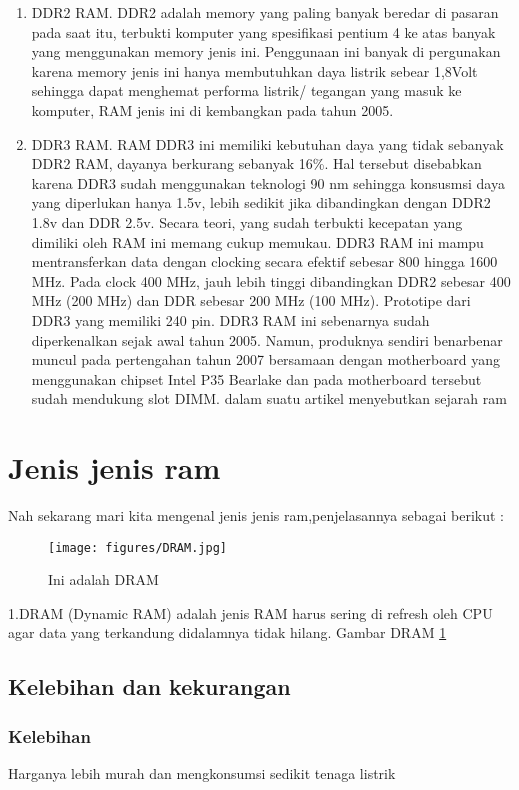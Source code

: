 \begin{enumerate}
\item DDR2 RAM. DDR2 adalah memory yang paling banyak beredar di pasaran pada saat itu, terbukti komputer yang spesifikasi pentium 4 ke atas banyak yang menggunakan memory jenis ini. Penggunaan ini banyak di pergunakan karena memory jenis ini hanya membutuhkan daya listrik sebear 1,8Volt sehingga dapat menghemat performa listrik/ tegangan yang masuk ke komputer, RAM jenis ini di kembangkan pada tahun 2005.

\item DDR3 RAM. RAM DDR3 ini memiliki kebutuhan daya yang tidak sebanyak DDR2 RAM, dayanya berkurang sebanyak 16\%. Hal tersebut disebabkan karena DDR3 sudah menggunakan teknologi 90 nm sehingga konsusmsi daya yang diperlukan hanya 1.5v, lebih sedikit jika dibandingkan dengan DDR2 1.8v dan DDR 2.5v. Secara teori, yang sudah terbukti kecepatan yang dimiliki oleh RAM ini memang cukup memukau. DDR3 RAM ini mampu mentransferkan data dengan clocking secara efektif sebesar 800 hingga 1600 MHz. Pada clock 400 MHz, jauh lebih tinggi dibandingkan DDR2 sebesar 400 MHz (200 MHz) dan DDR sebesar 200 MHz (100 MHz). Prototipe dari DDR3 yang memiliki 240 pin. DDR3 RAM ini sebenarnya sudah diperkenalkan sejak awal tahun 2005. Namun, produknya sendiri benar\-benar muncul pada pertengahan tahun 2007 bersamaan dengan motherboard yang menggunakan chipset Intel P35 Bearlake dan pada motherboard tersebut sudah mendukung slot DIMM.
dalam suatu artikel menyebutkan sejarah ram \cite{kan1995random}
\end{enumerate} 

\section{Jenis \- jenis ram}
Nah sekarang mari kita mengenal jenis \- jenis ram,penjelasannya sebagai berikut :


  \begin{figure}[ht]
  \centerline{\texttt{[image: figures/DRAM.jpg]}}
  \caption{Ini adalah DRAM}
  \label{DRAM}
  \end{figure}

1.DRAM (Dynamic RAM) adalah jenis RAM harus sering di refresh oleh CPU agar data yang terkandung didalamnya tidak hilang.
  Gambar DRAM \ref{DRAM}
  \subsection{Kelebihan dan kekurangan}
    \subsubsection{Kelebihan}
    \-Harganya lebih murah dan mengkonsumsi sedikit tenaga listrik
